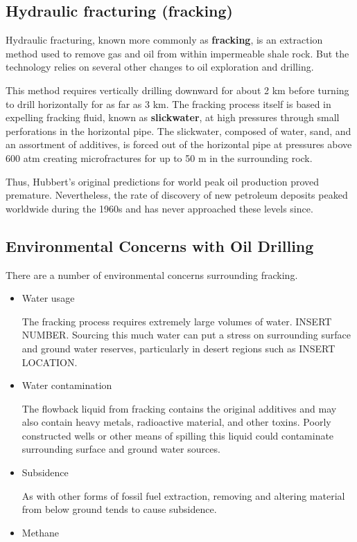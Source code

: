 \subsection{Hydraulic fracturing (fracking)} 

Hydraulic fracturing, known more commonly as \textbf{fracking}, is an extraction method used to remove gas and oil from within impermeable shale rock. But the technology relies on several other changes to oil exploration and drilling. 


This method requires vertically drilling downward for about 2 km before turning to drill horizontally for as far as 3 km.  The fracking process itself is based in expelling fracking fluid, known as \textbf{slickwater}, at high pressures through small perforations in the horizontal pipe. The slickwater, composed of water, sand, and an assortment of additives, is forced out of the horizontal pipe at pressures above 600 atm creating microfractures for up to 50 m in the surrounding rock.

Thus, Hubbert's original predictions for world peak oil production proved premature. Nevertheless, the rate of discovery of new petroleum deposits peaked worldwide during the 1960s and has never approached these levels since.

\subsection{Environmental Concerns with Oil Drilling}

There are a number of environmental concerns surrounding fracking. 


\begin{itemize}
\item Water usage 

The fracking process requires extremely large volumes of water. INSERT NUMBER. Sourcing this much water can put a stress on surrounding surface and ground water reserves, particularly in desert regions such as INSERT LOCATION.

\item Water contamination 

The flowback liquid from fracking contains the original additives and may also contain heavy metals, radioactive material, and other toxins. Poorly constructed wells or other means of spilling this liquid could contaminate surrounding surface and ground water sources. 



\item Subsidence

As with other forms of fossil fuel extraction, removing and altering material from below ground tends to cause subsidence.

\item Methane

\end{itemize}


